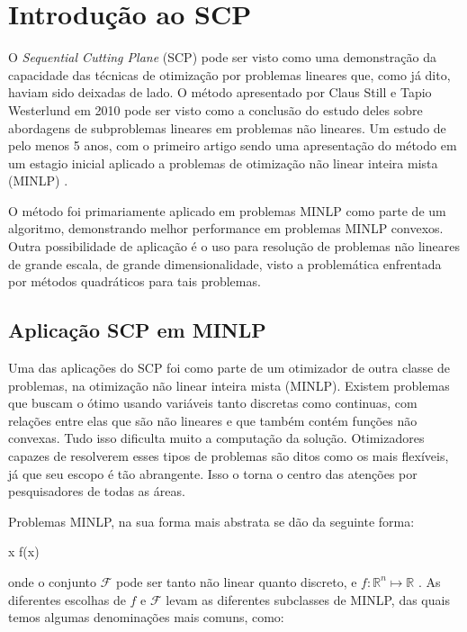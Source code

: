 \section{Introdução ao SCP}

\noindent
O \textit{Sequential Cutting Plane} (SCP) \cite{Still2010} pode ser visto como uma demonstração da
capacidade das técnicas de otimização por problemas lineares que, como já dito, haviam
sido deixadas de lado. O método apresentado por Claus Still e Tapio Westerlund em 2010
pode ser visto como a conclusão do estudo deles sobre abordagens de subproblemas lineares
em problemas não lineares. Um estudo de pelo menos 5 anos, com o primeiro artigo sendo
uma apresentação do método em um estagio inicial aplicado a problemas de otimização
não linear inteira mista (MINLP) \cite{Still_2005}.

O método foi primariamente aplicado em problemas MINLP como parte de um algoritmo,
demonstrando melhor performance em problemas MINLP convexos. Outra possibilidade de
aplicação é o uso para resolução de problemas não lineares de grande escala, de grande
dimensionalidade, visto a problemática enfrentada por métodos quadráticos para tais
problemas.

\subsection{Aplicação SCP em MINLP}

\noindent
Uma das aplicações do SCP foi como parte de um otimizador de outra classe de problemas, na
otimização não linear inteira mista (MINLP). Existem problemas que buscam o ótimo usando
variáveis tanto discretas como continuas, com relações entre elas que são não lineares e
que também contém funções não convexas. Tudo isso dificulta muito a computação da solução.
Otimizadores capazes de resolverem esses tipos de problemas são ditos como os mais flexíveis,
já que seu escopo é tão abrangente. Isso o torna o centro das atenções por pesquisadores de
todas as áreas.

Problemas MINLP, na sua forma mais abstrata se dão da seguinte forma:

\vspace{-15pt}
\begin{mini!}
{x}{ f(x) \label{minlp_obj}}{\label{prob_minlp}}{}
\end{mini!}
onde o conjunto \( \mathcal{F} \) pode ser tanto não linear quanto discreto, e \( f: \mathbb{R}^n \mapsto \mathbb{R}\) .
As diferentes escolhas
de \(f\) e \(\mathcal{F}\) levam as diferentes subclasses de MINLP, das quais temos algumas
denominações mais comuns, como:


